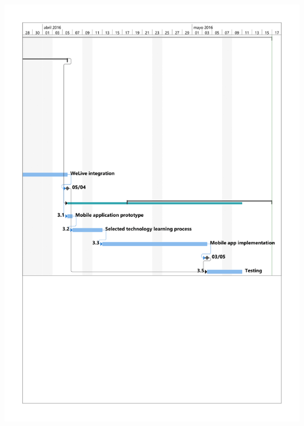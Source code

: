 \documentclass{DeustoFDP}
\begin{document}
\begin{center}
	\includegraphics[width=1\linewidth]{fig/g4}
\end{center}
\end{document}
